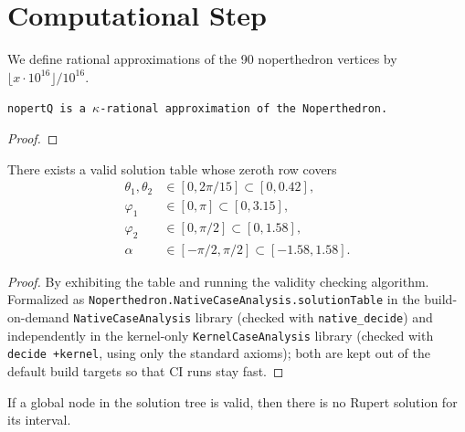 \chapter{Computational Step}

\begin{definition}\label{def:nopertQ}\leanok
  We define rational approximations of the 90 noperthedron vertices
  by $\lfloor x \cdot 10^{16} \rfloor/10^{16}$.
\end{definition}

\begin{theorem}
  \label{thm:nopertQ_approximate}
  \leanok
{}
\tt{nopertQ} is a $\kappa$-rational approximation of the Noperthedron.
\end{theorem}
\begin{proof}\leanok
\end{proof}

\begin{theorem}
\label{thm:exists_solution_table}
\leanok
There exists a valid solution table whose zeroth row covers
\begin{align*}
\theta_1,\theta_2&\in[0,2\pi/15] \subset [0,0.42], \\
\varphi_1&\in [0,\pi] \subset [0,3.15],\\
\varphi_2&\in [0,\pi/2] \subset [0,1.58],\\
\alpha &\in [-\pi/2,\pi/2] \subset [-1.58,1.58].
\end{align*}
\end{theorem}

\begin{proof}\leanok
{}
By exhibiting the table and running the validity checking algorithm.
Formalized as \texttt{Noperthedron.NativeCaseAnalysis.solutionTable}
in the build-on-demand \texttt{NativeCaseAnalysis} library (checked with
\texttt{native\_decide}) and independently in the kernel-only
\texttt{KernelCaseAnalysis} library (checked with \texttt{decide +kernel},
using only the standard axioms); both are kept out of the default build
targets so that CI runs stay fast.
\end{proof}

\begin{theorem}
\label{thm:solution_global}
If a global node in the solution tree is valid, then there is no Rupert solution for its interval.
\leanok
{}
\end{theorem}

